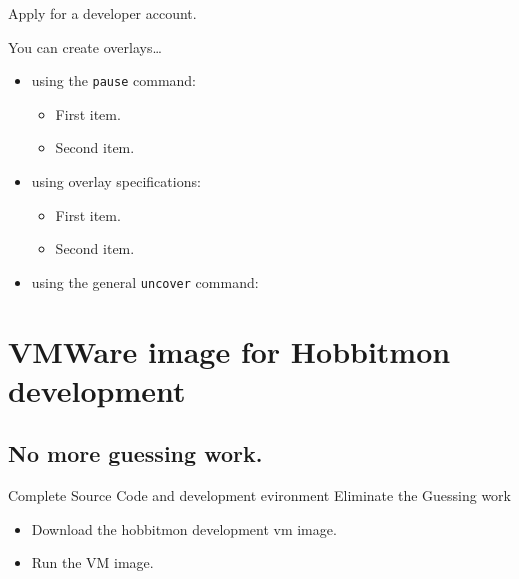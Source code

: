\documentclass{beamer}
\begin{document}
\begin{frame}{Apply for a developer account.}

  You can create overlays\dots

  \begin{itemize}
  \item using the \texttt{pause} command:
    \begin{itemize}
    \item
      First item.
      \pause
    \item    
      Second item.
    \end{itemize}
  \item
    using overlay specifications:
    \begin{itemize}
    \item<3->
      First item.
    \item<4->
      Second item.
    \end{itemize}
  \item
    using the general \texttt{uncover} command:
    \begin{itemize}
    \end{itemize}
  \end{itemize}


\end{frame}



\section{VMWare image for Hobbitmon development}

\subsection[all-in-one ]{No more guessing work.}

\begin{frame}{Complete Source Code and development evironment }{Eliminate the Guessing work }

  \begin{itemize}
  \item
    Download the hobbitmon development vm image.
  \item
    Run the VM image. 
  \end{itemize}
\end{frame}
\end{document}
